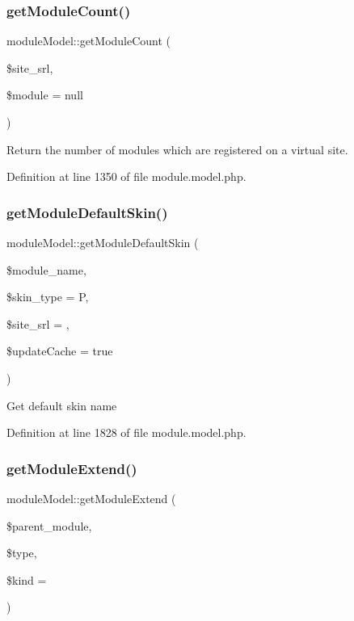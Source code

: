 \subsubsection{\texorpdfstring{get\+Module\+Count()}{getModuleCount()}}
{\footnotesize\ttfamily module\+Model\+::get\+Module\+Count (\begin{DoxyParamCaption}\item[{}]{\$site\+\_\+srl,  }\item[{}]{\$module = {\ttfamily null} }\end{DoxyParamCaption})}



Return the number of modules which are registered on a virtual site. 



Definition at line 1350 of file module.\+model.\+php.

\hypertarget{classmoduleModel_a740b445ffb57b7f7304cb7acf9f3f5b1}{}\label{classmoduleModel_a740b445ffb57b7f7304cb7acf9f3f5b1} 
\subsubsection{\texorpdfstring{get\+Module\+Default\+Skin()}{getModuleDefaultSkin()}}
{\footnotesize\ttfamily module\+Model\+::get\+Module\+Default\+Skin (\begin{DoxyParamCaption}\item[{}]{\$module\+\_\+name,  }\item[{}]{\$skin\+\_\+type = {\ttfamily \textquotesingle{}P\textquotesingle{}},  }\item[{}]{\$site\+\_\+srl = {},  }\item[{}]{\$update\+Cache = {\ttfamily true} }\end{DoxyParamCaption})}

Get default skin name 

Definition at line 1828 of file module.\+model.\+php.

\hypertarget{classmoduleModel_a1dd3c03b874a4f6e05f6b5e8ec283665}{}\label{classmoduleModel_a1dd3c03b874a4f6e05f6b5e8ec283665} 
\subsubsection{\texorpdfstring{get\+Module\+Extend()}{getModuleExtend()}}
{\footnotesize\ttfamily module\+Model\+::get\+Module\+Extend (\begin{DoxyParamCaption}\item[{}]{\$parent\+\_\+module,  }\item[{}]{\$type,  }\item[{}]{\$kind = {\ttfamily \textquotesingle{}\textquotesingle{}} }\end{DoxyParamCaption})}



